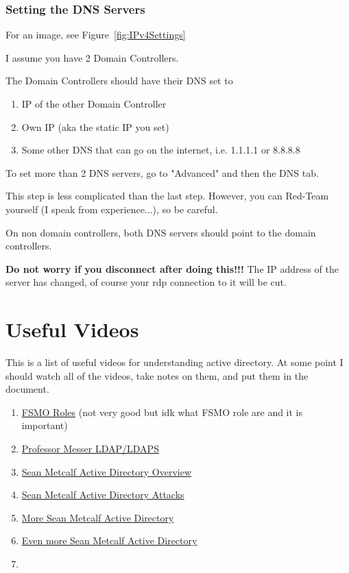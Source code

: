 \documentclass{article}
\begin{document}
\subsubsection{Setting the DNS Servers}
For an image, see Figure~\ref{fig:IPv4Settings}

I assume you have 2 Domain Controllers.

The Domain Controllers should have their DNS set to
\begin{enumerate}
        \item IP of the other Domain Controller
        \item Own IP (aka the static IP you set)
        \item Some other DNS that can go on the internet, i.e. 1.1.1.1 or 8.8.8.8
\end{enumerate}

To set more than 2 DNS servers, go to "Advanced" and then the DNS tab.

This step is less complicated than the last step. However, you can Red-Team yourself (I speak from experience...), so be careful.

On non domain controllers, both DNS servers should point to the domain controllers.

\textbf{Do not worry if you disconnect after doing this!!!}
The IP address of the server has changed, of course your rdp connection to it will be cut.

\section{Useful Videos}
This is a list of useful videos for understanding active directory.
At some point I should watch all of the videos, take notes on them, and put them in the document.
\begin{enumerate}
        \item \href{https://youtu.be/n5suPvKqo_Y}{FSMO Roles} (not very good but idk what FSMO role are and it is important)
        \item \href{https://youtu.be/5rEA7vRV3VE}{Professor Messer LDAP/LDAPS}
        \item \href{https://youtu.be/2w1cesS7pGY}{Sean Metcalf Active Directory Overview}
        \item \href{https://youtu.be/ze1UcSLOypw}{Sean Metcalf Active Directory Attacks}
        \item \href{https://youtu.be/Lz6haohGAMc}{More Sean Metcalf Active Directory}
        \item\href{https://youtu.be/b6GUXerE9Ac}{Even more Sean Metcalf Active Directory}
        \item 
\end{enumerate}
\end{document}

